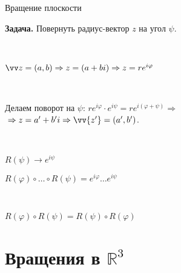 \documentclass[10pt]{beamer}
\begin{document}
		
	\begin{frame}{Вращение плоскости}
		{
		}
		{
			\textbf{Задача.} Повернуть радиус-вектор $z$ на угол $\psi$.
			
			~\pause
			
			$\vv z = (a,b) \Rightarrow z=(a+bi) \Rightarrow z=re^{i\varphi}$
			
			~\pause
			
			Делаем поворот на $\psi$: 
			$re^{i\varphi}\cdot e^{i\psi} = re^{i(\varphi+\psi)} \Rightarrow {}$
			${}\Rightarrow z=a'+b'i \Rightarrow \vv {z'} = (a',b') $.
			
			~\pause
			
			$R(\psi) \rightarrow e^{i\psi}$
			
			$R(\varphi)\circ \ldots \circ R(\psi) = e^{i\varphi}\ldots e^{i\psi}$
			
			~
			
			$R(\varphi)\circ R(\psi)=R(\psi)\circ R(\varphi)$
			
			
			
		}
		
	\end{frame}
	
	\section{Вращения в $\mathbb R^3$}
	
\end{document}

